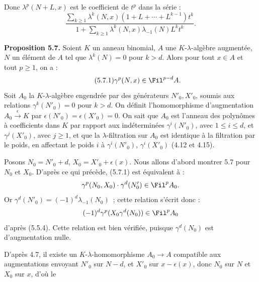 Donc \(\lambda^p(N+L,x)\) est le coefficient de \(t^p\) dans la série :
\[
  \frac{\displaystyle\sum_{k\ge1}\lambda^k(N,x)
        (1+L+\cdots+L^{k-1})t^k}
       {\displaystyle 1+\sum_{k\ge1}\lambda^k(N,x)
        \lambda_{-1}(N)L^k t^k}.
\]

\textbf{Proposition 5.7.} Soient \(K\) un anneau binomial, \(A\) une \(K\)-\(\lambda\)-algèbre augmentée, \(N\) un élément de \(A\) tel que \(\lambda^k(N)=0\) pour \(k>d\). Alors pour tout \(x\in A\) et tout \(p\ge1\), on a :
\begin{equation}\tag{5.7.1}
  \gamma^p(N,x)\in\Fil^{p-d}A.
\end{equation}
Soit \(A_0\) la \(K\)-\(\lambda\)-algèbre engendrée par des générateurs \(N'_0,X'_0\), soumis aux relations \(\gamma^k(N'_0)=0\) pour \(k>d\). On définit l'homomorphisme d'augmentation \(A_0\xrightarrow{\epsilon}K\) par \(\epsilon(N'_0)=\epsilon(X'_0)=0\). On sait que \(A_0\) est l'anneau des polynômes à coefficients dans \(K\) par rapport aux indéterminées \(\gamma^i(N'_0)\), avec \(1\le i\le d\), et \(\gamma^j(X'_0)\), avec \(j\ge1\), et que la \(\lambda\)-filtration sur \(A_0\) est identique à la filtration par le poids, en affectant le poids \(i\) à \(\gamma^i(N'_0)\), \(\gamma^i(X'_0)\) (4.12 et 4.15).

Posons \(N_0=N'_0+d\), \(X_0=X'_0+\epsilon(x)\). Nous allons d'abord montrer 5.7 pour \(N_0\) et \(X_0\). D'après ce qui précède, (5.7.1) est équivalent à :
\[
  \gamma^p(N_0,X_0)\cdot\gamma^d(N'_0)\in\Fil^pA_0.
\]
Or \(\gamma^d(N'_0)=(-1)^d\lambda_{-1}(N_0)\)~; cette relation s'écrit donc :
\[
  (-1)^d\gamma^p(X_0\gamma^d(N_0))\in\Fil^pA_0
\]
d'après (5.5.4). Cette relation est bien vérifiée, puisque \(\gamma^d(N_0)\) est d'augmentation nulle.

D'après 4.7, il existe un \(K\)-\(\lambda\)-homomorphisme \(A_0\longrightarrow A\) compatible aux augmentations envoyant \(N'_0\) sur \(N-d\), et \(X'_0\) sur \(x-\epsilon(x)\), donc \(N_0\) sur \(N\) et \(X_0\) sur \(x\), d'où le

